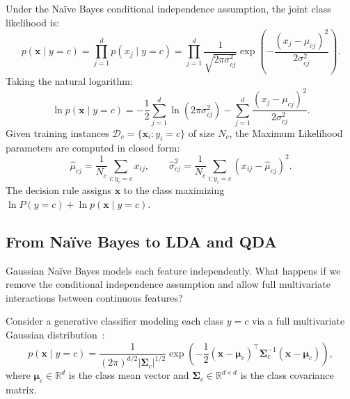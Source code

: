 Under the Naïve Bayes conditional independence assumption, the joint class likelihood is:
\begin{equation}
p(\mathbf{x} \mid y = c) = \prod_{j=1}^d p(x_j \mid y = c) = \prod_{j=1}^d \frac{1}{\sqrt{2\pi \sigma_{cj}^2}} \exp\left( -\frac{(x_j - \mu_{cj})^2}{2\sigma_{cj}^2} \right).
\end{equation}
Taking the natural logarithm:
\begin{equation}
\ln p(\mathbf{x} \mid y = c) = -\frac{1}{2} \sum_{j=1}^d \ln(2\pi \sigma_{cj}^2) - \sum_{j=1}^d \frac{(x_j - \mu_{cj})^2}{2\sigma_{cj}^2}.
\label{eq:gaussian_nb_log_likelihood}
\end{equation}
Given training instances $\mathcal{D}_c = \{\mathbf{x}_i : y_i = c\}$ of size $N_c$, the Maximum Likelihood parameters are computed in closed form:
\begin{equation}
\hat{\mu}_{cj} = \frac{1}{N_c} \sum_{i: y_i = c} x_{ij}, \qquad \hat{\sigma}_{cj}^2 = \frac{1}{N_c} \sum_{i: y_i = c} (x_{ij} - \hat{\mu}_{cj})^2.
\end{equation}
The decision rule assigns $\mathbf{x}$ to the class maximizing $\ln P(y = c) + \ln p(\mathbf{x} \mid y = c)$.

\subsection{From Naïve Bayes to LDA and QDA}
\label{sec:lda_qda_continuum}

Gaussian Naïve Bayes models each feature independently. What happens if we remove the conditional independence assumption and allow full multivariate interactions between continuous features?

Consider a generative classifier modeling each class $y = c$ via a full multivariate Gaussian distribution~\cite{bishop2024deep}:
\begin{equation}
p(\mathbf{x} \mid y = c) = \frac{1}{(2\pi)^{d/2} |\boldsymbol{\Sigma}_c|^{1/2}} \exp\left( -\frac{1}{2} (\mathbf{x} - \boldsymbol{\mu}_c)^\top \boldsymbol{\Sigma}_c^{-1} (\mathbf{x} - \boldsymbol{\mu}_c) \right),
\label{eq:multivariate_gaussian_class}
\end{equation}
where $\boldsymbol{\mu}_c \in \mathbb{R}^d$ is the class mean vector and $\boldsymbol{\Sigma}_c \in \mathbb{R}^{d \times d}$ is the class covariance matrix.

